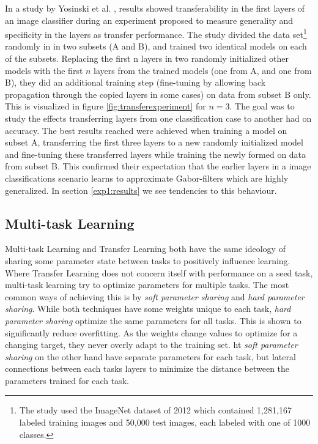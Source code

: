 In a study by Yosinski et al. \cite{yosinski2014transferable}, results showed transferability in the first layers of an image classifier during an experiment proposed to measure generality and specificity in the layers as transfer performance. The study divided the data set\footnote{The study used the ImageNet dataset of 2012 which contained 1,281,167 labeled training images and 50,000 test images, each labeled with one of 1000 classes.} randomly in in two subsets (A and B), and trained two identical models on each of the subsets. Replacing the first n layers in two randomly initialized other models with the first \(n\) layers from the trained models (one from A, and one from B), they did an additional training step (fine-tuning by allowing back propagation through the copied layers in some cases) on data from subset B only. This is visualized in figure \ref{fig:transferexperiment} for \(n=3\). The goal was to study the effects transferring layers from one classification case to another had on accuracy. The best results reached were achieved when training a model on subset A, transferring the first three layers to a new randomly initialized model and fine-tuning these transferred layers while training the newly formed on data from subset B. This confirmed their expectation that the earlier layers in a image classifications scenario learns to approximate Gabor-filters which are highly generalized. In section \ref{exp1:results} we see tendencies to this behaviour. 

\subsection{Multi-task Learning}
Multi-task Learning and Transfer Learning both have the same ideology of sharing some parameter state between tasks to positively influence learning. Where Transfer Learning does not concern itself with performance on a seed task, multi-task learning try to optimize parameters for multiple tasks. The most common ways of achieving this is by \textit{soft parameter sharing} and \textit{hard parameter sharing}. While both techniques have some weights unique to each task, \textit{hard parameter sharing} optimize the same parameters for all tasks. This is shown to significantly reduce overfitting\cite{hardparametersharing}. As the weights change values to optimize for a changing target, they never overly adapt to the training set. ht \textit{soft parameter sharing} on the other hand have separate parameters for each task, but lateral connections between each tasks layers to minimize the distance between the parameters trained for each task.

